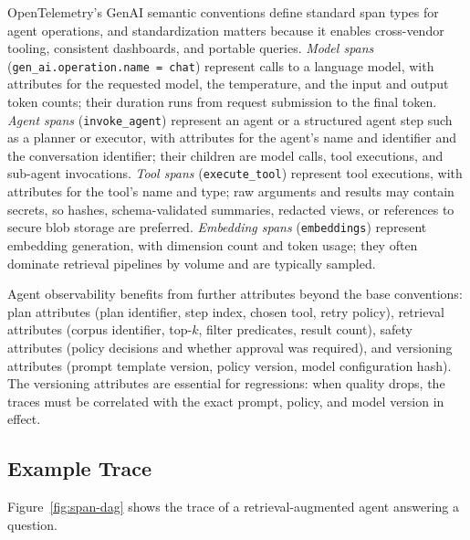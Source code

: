 \documentclass[11pt]{book}
\begin{document}
OpenTelemetry's GenAI semantic conventions \cite{otelgenai2025} define standard span types for agent operations, and standardization matters because it enables cross-vendor tooling, consistent dashboards, and portable queries. \textit{Model spans} (\texttt{gen\_ai.operation.name = chat}) represent calls to a language model, with attributes for the requested model, the temperature, and the input and output token counts; their duration runs from request submission to the final token. \textit{Agent spans} (\texttt{invoke\_agent}) represent an agent or a structured agent step such as a planner or executor, with attributes for the agent's name and identifier and the conversation identifier; their children are model calls, tool executions, and sub-agent invocations. \textit{Tool spans} (\texttt{execute\_tool}) represent tool executions, with attributes for the tool's name and type; raw arguments and results may contain secrets, so hashes, schema-validated summaries, redacted views, or references to secure blob storage are preferred. \textit{Embedding spans} (\texttt{embeddings}) represent embedding generation, with dimension count and token usage; they often dominate retrieval pipelines by volume and are typically sampled.

Agent observability benefits from further attributes beyond the base conventions: plan attributes (plan identifier, step index, chosen tool, retry policy), retrieval attributes (corpus identifier, top-$k$, filter predicates, result count), safety attributes (policy decisions and whether approval was required), and versioning attributes (prompt template version, policy version, model configuration hash). The versioning attributes are essential for regressions: when quality drops, the traces must be correlated with the exact prompt, policy, and model version in effect.

\subsection{Example Trace}

Figure~\ref{fig:span-dag} shows the trace of a retrieval-augmented agent answering a question.
\end{document}
